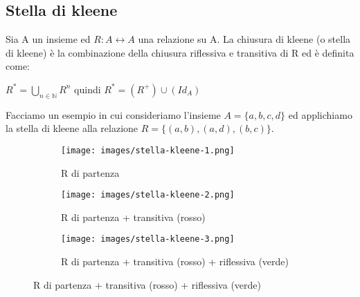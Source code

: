 \subsection{Stella di kleene}
\begin{definition}
    Sia A un insieme ed $R: A \longleftrightarrow A$ una relazione su A. La chiusura di kleene (o stella di kleene) è la combinazione della chiusura riflessiva e transitiva di R ed è definita come:
    \begin{center}
         $R^* = \bigcup\limits_{n \in \mathbb{N}} R^n$ \:\: quindi \:\: $R^* = (R^+) \cup (Id_A)$
    \end{center}
\end{definition}
\begin{example}
Facciamo un esempio in cui consideriamo l'insieme $A = \{a,b,c,d\}$ ed applichiamo la stella di kleene alla relazione $R = \{(a,b),(a,d),(b,c)\}$.
\end{example}
\begin{figure}[h!]
    \vspace{-20pt}
    \begin{subfigure}{.3\textwidth}
        \centering
        \texttt{[image: images/stella-kleene-1.png]}
        \caption{R di partenza}
    \end{subfigure}
    \hfill
    \begin{subfigure}{.3\textwidth}
        \centering
        \texttt{[image: images/stella-kleene-2.png]}
        \caption{R di partenza + transitiva (rosso)}
    \end{subfigure}
    \hfill
    \begin{subfigure}{.3\textwidth}
        \centering
        \texttt{[image: images/stella-kleene-3.png]}
        \caption{R di partenza + transitiva (rosso) + riflessiva (verde)}
    \end{subfigure}
\end{figure}


